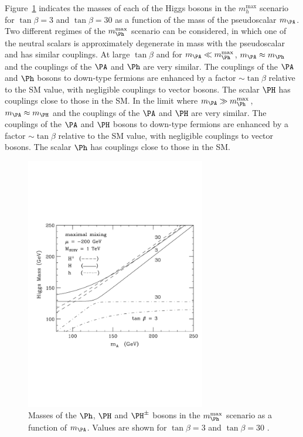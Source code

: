 Figure~\ref{fig:mhmaxmasses} indicates the
masses of each of the Higgs bosons in the $m_{h}^{\text{max}}$ scenario
for $\tan\beta=3$ and $\tan\beta=30$ as a function of the mass of the
pseudoscalar $m_{\PA}$. Two different regimes of the $m_{\Ph}^{\text{max}}$
scenario can be considered, in which one of the neutral scalars is approximately
degenerate in mass with the pseudoscalar and has similar couplings. 
At large $\tan\beta$ and for $m_{\PA} \ll m_{\Ph}^{\text{max}}$, $m_{\PA}
\approx m_{\Ph}$ and the couplings of the $\PA$ and $\Ph$ are very similar. The
couplings of the $\PA$ and $\Ph$ bosons to down-type fermions 
are enhanced by a factor $\sim \tan\beta$ relative to the \ac{SM} value, with
negligible couplings to vector bosons. The scalar $\PH$ has couplings
close to those in the \ac{SM}. In the limit where $m_{\PA} \gg
m_{\Ph}^{\text{max}}$, 
$m_{\PA} \approx m_{\PH}$ and the couplings of the $\PA$ and $\PH$ are
very similar. The couplings of the $\PA$ and $\PH$ bosons to down-type fermions 
are enhanced by a factor $\sim \tan\beta$ relative to the \ac{SM} value, 
with negligible couplings to vector bosons. The scalar $\Ph$ has couplings
close to those in the \ac{SM}. 

\begin{figure}[htbp]
   \includegraphics[width=0.7\textwidth]{plots/theory/mssm_masses_mhmax.pdf}
\caption[Masses of the $\Ph$, $\PH$ and $\PH^{\pm}$ bosons in the
$m_{\Ph}^{\text{max}}$ scenario as a function of $m_{\PA}$.]{Masses of the $\Ph$, $\PH$ and $\PH^{\pm}$ bosons in the
$m_{\Ph}^{\text{max}}$ scenario as a function of $m_{\PA}$. Values are shown for
$\tan\beta=3$ and $\tan\beta=30$ \cite{Carena:2002es}.}
\label{fig:mhmaxmasses}
\end{figure}


